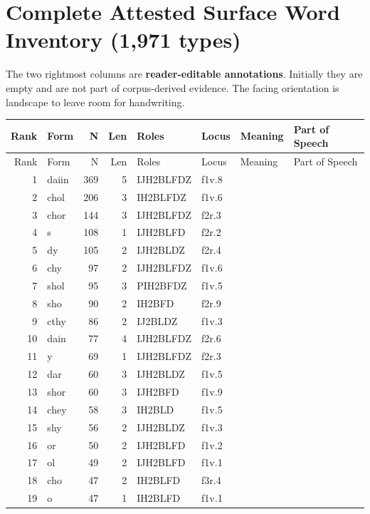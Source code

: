 \documentclass[11pt,a4paper]{article}
\begin{document}
\section{Complete Attested Surface Word Inventory (1,971 types)}
The two rightmost columns are \textbf{reader-editable annotations}. Initially they are empty and are not part of corpus-derived evidence. The facing orientation is landscape to leave room for handwriting.
\begin{landscape}
\footnotesize\renewcommand{\arraystretch}{1.16}
\setlength{\tabcolsep}{4.2pt}
\begin{longtable}{@{}r>{\ttfamily}lrrl>{\ttfamily}l>{\raggedright\arraybackslash}p{80mm}>{\raggedright\arraybackslash}p{36mm}@{}}
\toprule Rank & Form & N & Len & Roles & Locus & Meaning & Part of Speech\\\midrule\endfirsthead
\toprule Rank & Form & N & Len & Roles & Locus & Meaning & Part of Speech\\\midrule\endhead
1 & daiin & 369 & 5 & IJH2BLFDZ & f1v.8 &  & \\
2 & chol & 206 & 3 & IH2BLFDZ & f1v.6 &  & \\
3 & chor & 144 & 3 & IJH2BLFDZ & f2r.3 &  & \\
4 & s & 108 & 1 & IJH2BLFD & f2r.2 &  & \\
5 & dy & 105 & 2 & IJH2BLDZ & f2r.4 &  & \\
6 & chy & 97 & 2 & IJH2BLFDZ & f1v.6 &  & \\
7 & shol & 95 & 3 & PIH2BFDZ & f1v.5 &  & \\
8 & sho & 90 & 2 & IH2BFD & f2r.9 &  & \\
9 & cthy & 86 & 2 & IJ2BLDZ & f1v.3 &  & \\
10 & dain & 77 & 4 & IJH2BLFDZ & f2r.6 &  & \\
11 & y & 69 & 1 & IJH2BLFDZ & f2r.3 &  & \\
12 & dar & 60 & 3 & IJH2BLDZ & f1v.5 &  & \\
13 & shor & 60 & 3 & IJH2BFD & f1v.9 &  & \\
14 & chey & 58 & 3 & IH2BLD & f1v.5 &  & \\
15 & shy & 56 & 2 & IJH2BLDZ & f1v.3 &  & \\
16 & or & 50 & 2 & IJH2BLFD & f1v.2 &  & \\
17 & ol & 49 & 2 & IJH2BLFD & f1v.1 &  & \\
18 & cho & 47 & 2 & IH2BLFD & f3r.4 &  & \\
19 & o & 47 & 1 & IH2BLFD & f1v.1 &  & \\

\end{longtable}
\end{landscape}
\end{document}
